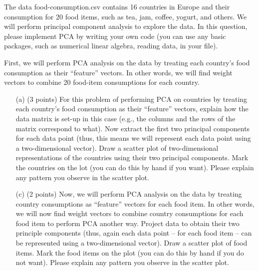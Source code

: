 \documentclass[twoside,10pt]{article}
\begin{document}
The data \textsf{food-consumption.csv} contains 16 countries in Europe and their consumption for 20 food items, such as tea, jam, coffee, yogurt, and others. We will perform principal component analysis to explore the data. In this question, please implement PCA by writing your own code (you can use any basic packages, such as numerical linear algebra, reading data, in your file).


\vspace{.1in}
First, we will perform PCA analysis on the data by treating each country's food consumption as their ``feature'' vectors. In other words, we will find weight vectors to combine 20 food-item consumptions for each country.  
 
\begin{enumerate}

\item[(a)] (3 points) For this problem of performing PCA on countries by treating each country's food consumption as their ``feature'' vectors, explain how the data matrix is set-up in this case (e.g., the columns and the rows of the matrix correspond to what). Now extract the first two principal components for each data point (thus, this means we will represent each data point using a two-dimensional vector). Draw a scatter plot of two-dimensional representations of the countries using their two principal components. Mark the countries on the lot (you can do this by hand if you want). Please explain any pattern you observe in the scatter plot.

\item[(c)] (2 points) Now, we will perform PCA analysis on the data by treating country consumptions as ``feature'' vectors for each food item. In other words, we will now find weight vectors to combine country consumptions for each food item to perform PCA another way. Project data to obtain their two principle components (thus, again each data point -- for each food item -- can be represented using a two-dimensional vector). Draw a scatter plot of food items. Mark the food items on the plot (you can do this by hand if you do not want). Please explain any pattern you observe in the scatter plot.
\end{enumerate}
\end{document}
